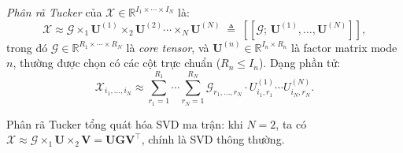 \begin{definition}
\textit{Phân rã Tucker} của $\mathcal{X} \in \mathbb{R}^{I_1 \times \cdots \times I_N}$ là:
\begin{equation}
    \mathcal{X} \approx \mathcal{G} \times_1 \mathbf{U}^{(1)} \times_2 \mathbf{U}^{(2)} \cdots \times_N \mathbf{U}^{(N)}
    \;\triangleq\; [\![\mathcal{G};\, \mathbf{U}^{(1)},\ldots,\mathbf{U}^{(N)}]\!],
\end{equation}
trong đó $\mathcal{G} \in \mathbb{R}^{R_1 \times \cdots \times R_N}$ là \textit{core tensor}, và $\mathbf{U}^{(n)} \in \mathbb{R}^{I_n \times R_n}$ là factor matrix mode $n$, thường được chọn có các cột trực chuẩn ($R_n \leq I_n$). Dạng phần tử:
\begin{equation}
    \mathcal{X}_{i_1,\ldots,i_N} \approx \sum_{r_1=1}^{R_1}\cdots\sum_{r_N=1}^{R_N} \mathcal{G}_{r_1,\ldots,r_N} \cdot U^{(1)}_{i_1,r_1} \cdots U^{(N)}_{i_N,r_N}.
\end{equation}
\end{definition}

Phân rã Tucker tổng quát hóa SVD ma trận: khi $N=2$, ta có $\mathcal{X} \approx \mathcal{G} \times_1 \mathbf{U} \times_2 \mathbf{V} = \mathbf{U}\mathbf{G}\mathbf{V}^\top$, chính là SVD thông thường.

